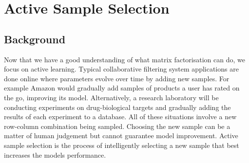 \chapter{Active Sample Selection}
\ifpdf
    \graphicspath{{Chapter2/Chapter2Figs/PNG/}{Chapter2/Chapter2Figs/PDF/}{Chapter2/Chapter2Figs/}}
\else
    \graphicspath{{Chapter2/Chapter2Figs/EPS/}{Chapter2/Chapter2Figs/}}
\fi
{}
\section{Background}

Now that we have a good understanding of what matrix factorisation can do, we focus on active learning. Typical collaborative filtering system applications are done online where parameters evolve over time by adding new samples. For example Amazon would gradually add samples of products a user has rated on the go, improving its model. Alternatively, a research laboratory will be conducting experiments on drug-biological targets and gradually adding the results of each experiment to a database. All of these situations involve a new row-column combination being sampled. Choosing the new sample can be a matter of human judgement but cannot guarantee model improvement. Active sample selection is the process of intelligently selecting a new sample that best increases the models performance.




